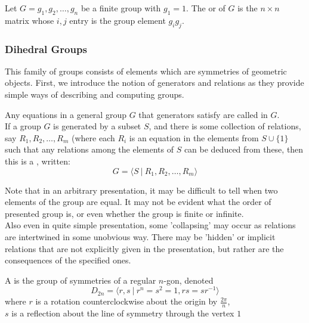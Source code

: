 \begin{definition}
Let $G = {g_1, g_2, \ldots, g_n}$ be a finite group with $g_1 = 1$. The  or  of $G$ is the $n \times n$ matrix whose $i,j$ entry is the group element $g_i g_j$.
\end{definition}

\subsubsection{Dihedral Groups}

This family of groups consists of elements which are symmetries of geometric objects. First, we introduce the notion of generators and relations as they provide simple ways of describing and computing groups.

\begin{definition}
Any equations in a general group $G$ that generators satisfy are called  in $G$.\\
If a group $G$ is generated by a subset $S$, and there is some collection of relations, say $R_1, R_2, \ldots, R_m$ (where each $R_i$ is an equation in the elements from $S \cup \{1\}$ such that any relations among the elements of $S$ can be deduced from these, then this is a , written:
\begin{equation}
G = \langle S \ \vert \ R_1, R_2, \ldots, R_m \rangle \nonumber 
\end{equation}
\end{definition}

Note that in an arbitrary presentation, it may be difficult to tell when two elements of the group are equal. It may not be evident what the order of presented group is, or even whether the group is finite or infinite.\\
Also even in quite simple presentation, some 'collapsing' may occur as relations are intertwined in some unobvious way. There may be 'hidden' or implicit relations that are not explicitly given in the presentation, but rather are the consequences of the specified ones.

\begin{definition}
A  is the group of symmetries of a regular $n$-gon, denoted
\begin{equation}
D_{2n} = \langle r,s \ \vert \ r^n = s^2 = 1, rs = sr^{-1} \rangle \nonumber
\end{equation}
where $r$ is a rotation counterclockwise about the origin by $\frac{2\pi}{n}$,\\
$s$ is a reflection about the line of symmetry through the vertex $1$
\end{definition}

